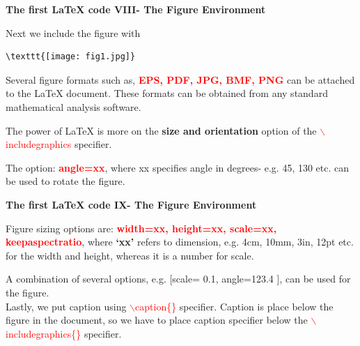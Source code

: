 \documentclass[xcolor=dvipsnames]{beamer}
\begin{document}
\begin{frame}[fragile]{\textbf{The first \LaTeX{} code VIII- The Figure Environment}}


\justifying

Next we include the figure with\\

\vspace{0.1cm}
\begin{center}
\begin{minipage}{8cm}
\color{red}\begin{Verbatim}[frame=single]
\texttt{[image: fig1.jpg]}
\end{Verbatim}
\end{minipage}
\end{center}

\vspace{0.1cm}
Several figure formats such as, \textcolor{red}{\textbf{EPS, PDF, JPG, BMF, PNG}} can be attached to the \LaTeX{} document. These formats can be obtained from any standard mathematical analysis software. \\

\vspace{0.1cm}

The power of \LaTeX{} is more on the \textbf{size and orientation} option of the \textcolor{red}{$\backslash$includegraphics} specifier.\\

\vspace{0.3cm}

The option: \textcolor{red}{\textbf{angle=xx}}, where xx specifies angle in degrees- e.g. 45, 130 etc. can be used to rotate the figure.


\end{frame}

\begin{frame}[fragile]{\textbf{The first \LaTeX{} code IX- The Figure Environment}}


\justifying

Figure sizing options are: \textcolor{red}{\textbf{width=xx, height=xx, scale=xx, keepaspectratio}}, where \textbf{`xx'} refers to dimension, e.g. 4cm, 10mm, 3in, 12pt etc. for the width and height, whereas it is a number for scale.\\

\vspace{0.4cm}

A combination of several options, e.g. [scale= 0.1, angle=123.4 ], can be used for the figure.\\

\vspace{0.4cm}
Lastly, we put caption using  \textcolor{red}{$\backslash$caption\{\}} specifier. Caption is place below the figure in the document, so we have to place caption specifier below the \textcolor{red}{$\backslash$includegraphics\{\}} specifier.

\end{frame}
\end{document}
